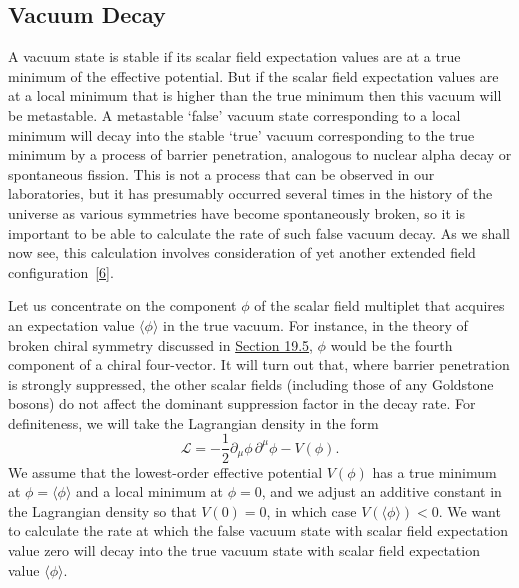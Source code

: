 \subsection{Vacuum Decay}
\label{sec:23.8}

A vacuum state is stable if its scalar field expectation values are at a true minimum of the effective potential. But if the scalar field expectation values are at a local minimum that is higher than the true minimum then this vacuum will be metastable. A metastable `false' vacuum state corresponding to a local minimum will decay into the stable `true' vacuum corresponding to the true minimum by a process of barrier penetration, analogous to nuclear alpha decay or spontaneous fission. This is not a process that can be observed in our laboratories, but it has presumably occurred several times in the history of the universe as various symmetries have become spontaneously broken, so it is important to be able to calculate the rate of such false vacuum decay. As we shall now see, this calculation involves consideration of yet another extended field configuration~\hyperref[ch23-ref-6]{[6]}.

Let us concentrate on the component $\phi$ of the scalar field multiplet that acquires an expectation value $\langle\phi\rangle$ in the true vacuum. For instance, in the theory of broken chiral symmetry discussed in \hyperref[sec:19.5]{Section 19.5}, $\phi$ would be the fourth component of a chiral four-vector. It will turn out that, where barrier penetration is strongly suppressed, the other scalar fields (including those of any Goldstone bosons) do not affect the dominant suppression factor in the decay rate. For definiteness, we will take the Lagrangian density in the form
\begin{equation}
 \mathcal L=-\frac{1}{2}\partial_\mu\phi\,\partial^\mu\phi-V(\phi).
 \tag{23.8.1}\label{eq:23.8.1}
\end{equation}
We assume that the lowest-order effective potential $V(\phi)$ has a true minimum at $\phi=\langle\phi\rangle$ and a local minimum at $\phi=0$, and we adjust an additive constant in the Lagrangian density so that $V(0)=0$, in which case $V(\langle\phi\rangle)<0$. We want to calculate the rate at which the false vacuum state with scalar field expectation value zero will decay into the true vacuum state with scalar field expectation value $\langle\phi\rangle$.

